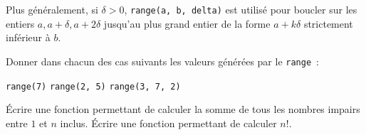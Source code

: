 \documentclass{magnoliaold}
\begin{document}
Plus généralement, si $\delta > 0$, \verb_range(a, b, delta)_ est utilisé pour boucler sur les entiers $a, a+\delta, a+2\delta$ jusqu'au plus grand entier de la forme $a + k\delta$ strictement inférieur à $b$.
\vspace{2ex}
\begin{exos}
\exo Donner dans chacun des cas suivants les valeurs générées par le \verb_range_~:
\begin{questions}
\question \verb_range(7)_
\question \verb_range(2, 5)_
\question \verb_range(3, 7, 2)_
\end{questions}
\exo Écrire une fonction permettant de calculer la somme de tous les nombres impairs
  entre $1$ et $n$ inclus.
\exo Écrire une fonction permettant de calculer $n!$.
\end{exos}
\bigskip



\end{document}
